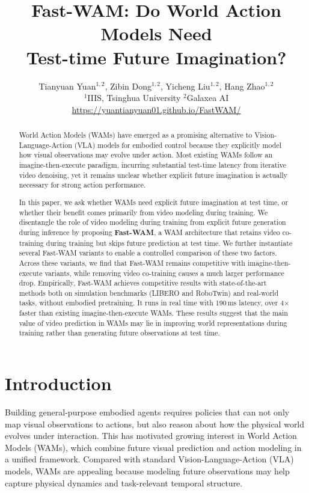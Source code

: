 \documentclass{article}
\title{Fast-WAM: Do World Action Models Need \\Test-time Future Imagination?}
\author{%
    Tianyuan Yuan$^{1,2}$,
    Zibin Dong$^{1,2}$,
    Yicheng Liu$^{1,2}$,
    Hang Zhao$^{1,2}$
    \\[1ex]
    $^{1}$IIIS, Tsinghua University \hspace{1em}$^{2}$Galaxea AI\\
  \url{https://yuantianyuan01.github.io/FastWAM/} \\
}
\begin{document}
\maketitle
\begin{abstract}
World Action Models (WAMs) have emerged as a promising alternative to Vision-Language-Action (VLA) models for embodied control because they explicitly model how visual observations may evolve under action. Most existing WAMs follow an imagine-then-execute paradigm, incurring substantial test-time latency from iterative video denoising, yet it remains unclear whether explicit future imagination is actually necessary for strong action performance.

In this paper, we ask whether WAMs need explicit future imagination at test time, or whether their benefit comes primarily from video modeling during training. We disentangle the role of video modeling during training from explicit future generation during inference by proposing \textbf{Fast-WAM}, a WAM architecture that retains video co-training during training but skips future prediction at test time. 
We further instantiate several Fast-WAM variants to enable a controlled comparison of these two factors. Across these variants, we find that Fast-WAM remains competitive with imagine-then-execute variants, while removing video co-training causes a much larger performance drop. Empirically, Fast-WAM achieves competitive results with state-of-the-art methods both on simulation benchmarks (LIBERO and RoboTwin) and real-world tasks, without embodied pretraining. It runs in real time with 190\,ms latency, over 4$\times$ faster than existing imagine-then-execute WAMs. These results suggest that the main value of video prediction in WAMs may lie in improving world representations during training rather than generating future observations at test time.
\end{abstract}



\section{Introduction}

Building general-purpose embodied agents requires policies that can not only map visual observations to actions, but also reason about how the physical world evolves under interaction. This has motivated growing interest in World Action Models (WAMs), which combine future visual prediction and action modeling in a unified framework. Compared with standard Vision-Language-Action (VLA) models, WAMs are appealing because modeling future observations may help capture physical dynamics and task-relevant temporal structure.
\end{document}

